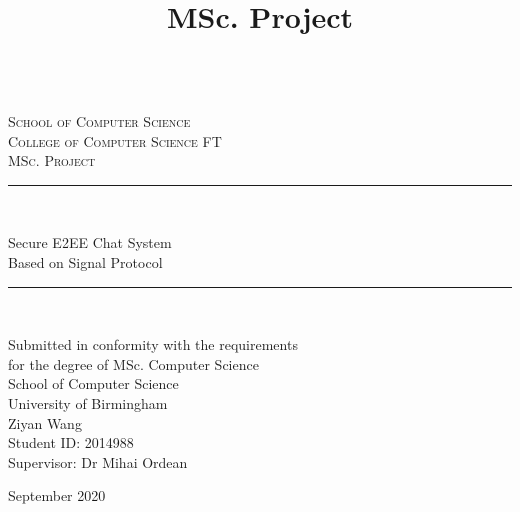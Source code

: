 \documentclass[twoside,11pt,a4paper]{article}
\title{MSc. Project\\\bhamthesistitle}
\author{\textsf{\bhamstudentname}}
\date{}
\newcommand{\bhamstudentname}{Ziyan Wang}
\newcommand{\bhamfronttitle}{Secure E2EE Chat System\\Based on Signal Protocol}
\newcommand{\bhamschool}{School of Computer Science}
\newcommand{\bhamcollege}{Computer Science FT}
\newcommand{\bhamdegree}{MSc. Computer Science}
\newcommand{\bhamid}{2014988}
\newcommand{\bhamsupervisor}{Dr Mihai Ordean}
\newcommand{\bhamyear}{2020}
\newcommand{\HRule}{\rule{\linewidth}{0.5mm}}
\begin{document}
\begin{titlepage}
\begin{center}
\begin{minipage}{6in}
  \centering
  \hspace*{.2in}
  \end{minipage}
  \\ [1.0cm]
\textsc{{\LARGE \bhamschool\\}College of \bhamcollege}\\[3.5cm]

\textsc{\Large MSc. Project}\\[0.5cm]

\HRule \\[0.4cm]
\begin{center}\Huge
\bhamfronttitle
\end{center}
\HRule \\[1.5cm]

\begin{center}
Submitted in conformity with the requirements\\ for the degree of \bhamdegree\\
\bhamschool\\ University of Birmingham\\
\vspace{2cm}
\bhamstudentname\\
Student ID: \bhamid\\
Supervisor: \bhamsupervisor      
\end{center}
\vfill

{\large September \bhamyear}

\end{center}
\end{titlepage}
\clearpage
\end{document}

